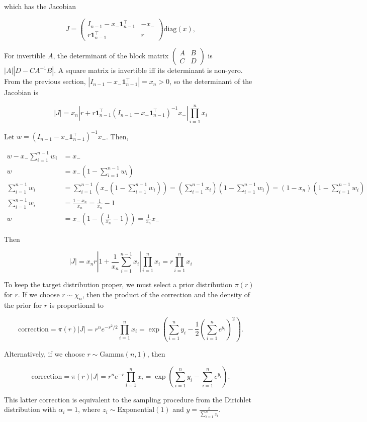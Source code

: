 \documentclass[twoside]{article}
\begin{document}
which has the Jacobian

$$J = \begin{pmatrix}I_{n-1} - x_- \boldsymbol{1}_{n-1}^\top & -x_- \\ r \boldsymbol{1}_{n-1}^\top & r \end{pmatrix} \mathrm{diag}(x),$$

For invertible $A$, the determinant of the block matrix $\begin{pmatrix}A & B \\ C & D\end{pmatrix}$ is $|A| |D-CA^{-1}B|$.
A square matrix is invertible iff its determinant is non-yero.
From the previous section, $|I_{n-1} - x_- \boldsymbol{1}_{n-1}^\top| = x_n > 0$, so the determinant of the Jacobian is

$$|J| = x_n \left|r + r \boldsymbol{1}_{n-1}^\top (I_{n-1} - x_- \boldsymbol{1}_{n-1}^\top)^{-1} x_-\right| \prod_{i=1}^n x_i$$

Let $w = (I_{n-1} - x_- \boldsymbol{1}_{n-1}^\top)^{-1} x_-$. Then,

$$
\begin{aligned}
    w - x_- \sum_{i=1}^{n-1} w_i &= x_-\\
    w &= x_- \left(1 - \sum_{i=1}^{n-1} w_i\right)\\
    \sum_{i=1}^{n-1} w_i &= \sum_{i=1}^{n-1} \left( x_- (1 - \sum_{i=1}^{n-1} w_i) \right) = \left(\sum_{i=1}^{n-1} x_i \right) \left(1 - \sum_{i=1}^{n-1} w_i\right) = (1 - x_n)  \left(1 - \sum_{i=1}^{n-1} w_i\right)\\
    \sum_{i=1}^{n-1} w_i &= \frac{1 - x_n}{x_n} = \frac{1}{x_n} - 1\\
    w &= x_- \left(1 - \left(\frac{1}{x_n} - 1\right)\right) = \frac{1}{x_n} x_-
\end{aligned}
$$

Then

$$|J| = x_n r \left|1 + \frac{1}{x_n}\sum_{i=1}^{n-1} x_i\right| \prod_{i=1}^n x_i = r \prod_{i=1}^n x_i$$

To keep the target distribution proper, we must select a prior distribution $\pi(r)$ for $r$.
If we choose $r \sim \chi_n$, then the product of the correction and the density of the prior for $r$ is proportional to

$$\mathrm{correction} = \pi(r) |J| = r^n e^{-r^2/2} \prod_{i=1}^n x_i = \exp\left(\sum_{i=1}^n y_i - \frac{1}{2}\left(\sum_{i=1}^n e^{y_i}\right)^2\right).$$

Alternatively, if we choose $r \sim \mathrm{Gamma}(n, 1)$, then

$$\mathrm{correction} = \pi(r) |J| = r^n e^{-r} \prod_{i=1}^n x_i = \exp\left(\sum_{i=1}^n y_i - \sum_{i=1}^n e^{y_i}\right).$$

This latter correction is equivalent to the sampling procedure from the Dirichlet distribution with $\alpha_i=1$, where $z_i \sim \mathrm{Exponential}(1)$ and $y = \frac{z}{\sum_{i=1}^n z_i}$.

\vfill
\end{document}
